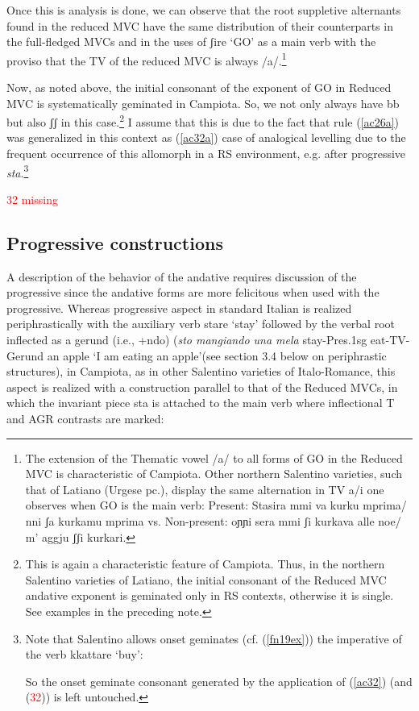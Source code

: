 \documentclass[output=paper]{langscibook}
\begin{document}
Once this is analysis is done, we can observe that the root suppletive alternants found in the reduced MVC have the same distribution of their counterparts in the full-fledged MVCs and in the uses of  ʃire ‘GO’ as a main verb with the proviso that the TV of the reduced MVC is always /a/.\footnote{The extension of the Thematic vowel /a/ to all forms of GO in the Reduced MVC is characteristic of Campiota.  Other northern  Salentino varieties, such that of Latiano (Urgese pc.), display the same alternation in TV a/i one observes when GO is the main verb: Present: Stasira mmi va kurku mprima/ nni ʃa kurkamu mprima vs. Non-present: oɲɲi sera mmi ʃi kurkava alle noe/ m’ aggju ʃʃi kurkari.}

Now, as noted above, the initial consonant of the exponent of GO in Reduced MVC is systematically geminated in Campiota.  So, we not only always have bb but also ʃʃ in this case.\footnote{
This is again a characteristic feature of Campiota.  Thus, in the northern Salentino varieties of Latiano, the initial consonant of the Reduced MVC andative exponent is geminated only in RS contexts, otherwise it is single.  See examples in the preceding note.} I assume that this is due to the fact that rule (\ref{ac26a}) was generalized in this context as (\ref{ac32a}) case of analogical levelling due to the frequent occurrence of this allomorph in a RS environment, e.g. after progressive \textit{sta}.\footnote{
Note that Salentino allows onset geminates (cf. (\ref{fn19ex})) the imperative of the verb kkattare ‘buy’:

\z

So the onset geminate consonant generated by the application of (\ref{ac32}) (and (\textcolor{red}{32})) is left untouched.
}

\ea \label{ac32} \textcolor{red}{32 missing}
    \ea \label{ac32a}
    \z
\z

\subsection{Progressive constructions}

A description of the behavior of the andative requires discussion of the progressive since the andative forms are more felicitous when used with the progressive.
Whereas progressive aspect in standard Italian is realized periphrastically with the auxiliary verb stare ‘stay’ followed by the verbal root inflected as a gerund (i.e., +ndo) (\textit{sto mangiando una mela} stay-Pres.1sg eat-TV-Gerund an apple ‘I am eating an apple’(see section 3.4 below on periphrastic structures), in Campiota, as in other Salentino varieties of Italo-Romance, this aspect is realized with a construction parallel to that of the Reduced MVCs, in which the invariant piece sta is attached to the main verb where inflectional T and AGR contrasts are marked:
\end{document}
